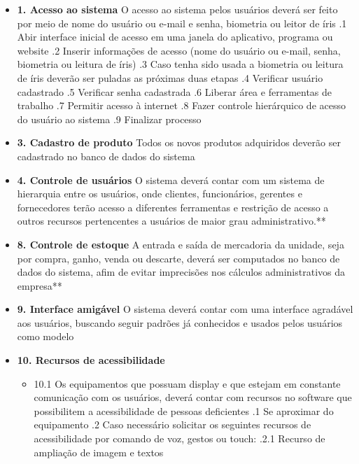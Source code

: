\begin{itemize}[label={}]
	\item \textbf{1. Acesso ao sistema}
		 O acesso ao sistema pelos usuários deverá ser feito por meio de nome do usuário ou e-mail e senha, biometria ou 	      
leitor de íris
			.1 Abir interface inicial de acesso em uma janela do aplicativo, programa ou website
			.2 Inserir informações de acesso (nome do usuário ou e-mail, senha, biometria ou leitura de íris) 
			.3 Caso tenha sido usada a biometria ou leitura de íris deverão ser puladas as próximas duas etapas
			.4 Verificar usuário cadastrado 
			.5 Verificar senha cadastrada
			.6 Liberar área e ferramentas de trabalho
			.7 Permitir acesso à internet
			.8 Fazer controle hierárquico de acesso do usuário ao sistema
			.9 Finalizar processo
	\item \textbf{3. Cadastro de produto}
		 Todos os novos produtos adquiridos deverão ser cadastrado no banco de dados do sistema
	\item \textbf{4. Controle de usuários}
		 O sistema deverá contar com um sistema de hierarquia entre os usuários, onde clientes, funcionários, gerentes e fornecedores terão acesso a diferentes ferramentas e restrição de acesso a outros recursos pertencentes a usuários de maior grau administrativo.**
	\item \textbf{8. Controle de estoque}
		 A entrada e saída de mercadoria da unidade, seja por compra, ganho, venda ou descarte, deverá ser computados no banco de dados do sistema, afim de evitar imprecisões nos cálculos administrativos da empresa**
	\item \textbf{9. Interface amigável}
		 O sistema deverá contar com uma interface agradável aos usuários, buscando seguir padrões já conhecidos e usados pelos usuários como modelo
	\item \textbf{10. Recursos de acessibilidade}
	\begin{itemize}[label={}]
		\item 10.1 Os equipamentos que possuam display e que estejam em constante comunicação com os usuários, deverá contar com recursos no software que possibilitem a acessibilidade de pessoas deficientes 
			.1 Se aproximar do equipamento
			.2 Caso necessário solicitar os seguintes recursos de acessibilidade por comando de voz, gestos ou touch:
				.2.1 Recurso de ampliação de imagem e textos

\end{itemize}
\end{itemize}

